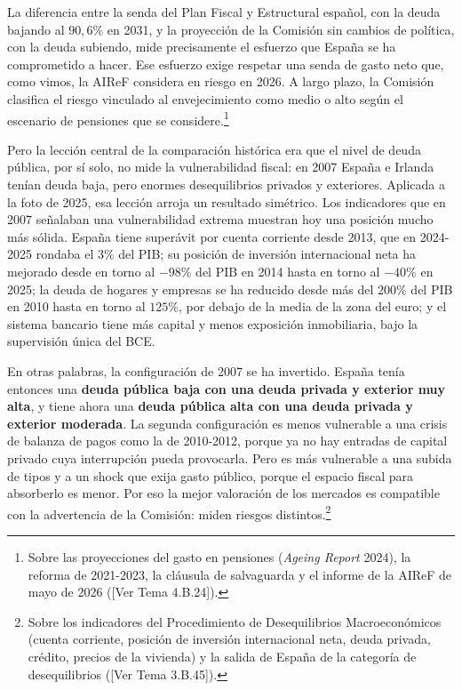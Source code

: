 \documentclass[10pt,a4paper]{article}
\newcommand{\authorfont}[1]{{\fontfamily{EBGaramond-TLF}\selectfont #1}}
\begin{document}
La diferencia entre la senda del Plan Fiscal y Estructural español, con la deuda bajando al $90,6\%$ en 2031, y la proyección de la Comisión sin cambios de política, con la deuda subiendo, mide precisamente el esfuerzo que España se ha comprometido a hacer. Ese esfuerzo exige respetar una senda de gasto neto que, como vimos, la AIReF considera en riesgo en 2026. A largo plazo, la Comisión clasifica el riesgo vinculado al envejecimiento como medio o alto según el escenario de pensiones que se considere.\footnote{Sobre las proyecciones del gasto en pensiones (\textit{Ageing Report} 2024), la reforma de 2021-2023, la cláusula de salvaguarda y el informe de la AIReF de mayo de 2026 ([\authorfont{Ver Tema 4.B.24}]).
}

Pero la lección central de la comparación histórica era que el nivel de deuda pública, por sí solo, no mide la vulnerabilidad fiscal: en 2007 España e Irlanda tenían deuda baja, pero enormes desequilibrios privados y exteriores. Aplicada a la foto de 2025, esa lección arroja un resultado simétrico. Los indicadores que en 2007 señalaban una vulnerabilidad extrema muestran hoy una posición mucho más sólida. España tiene superávit por cuenta corriente desde 2013, que en 2024-2025 rondaba el $3\%$ del PIB; su posición de inversión internacional neta ha mejorado desde en torno al $-98\%$ del PIB en 2014 hasta en torno al $-40\%$ en 2025; la deuda de hogares y empresas se ha reducido desde más del $200\%$ del PIB en 2010 hasta en torno al $125\%$, por debajo de la media de la zona del euro; y el sistema bancario tiene más capital y menos exposición inmobiliaria, bajo la supervisión única del BCE.

En otras palabras, la configuración de 2007 se ha invertido. España tenía entonces una \textbf{deuda pública baja con una deuda privada y exterior muy alta}, y tiene ahora una \textbf{deuda pública alta con una deuda privada y exterior moderada}. La segunda configuración es menos vulnerable a una crisis de balanza de pagos como la de 2010-2012, porque ya no hay entradas de capital privado cuya interrupción pueda provocarla. Pero es más vulnerable a una subida de tipos y a un shock que exija gasto público, porque el espacio fiscal para absorberlo es menor. Por eso la mejor valoración de los mercados es compatible con la advertencia de la Comisión: miden riesgos distintos.\footnote{Sobre los indicadores del Procedimiento de Desequilibrios Macroeconómicos (cuenta corriente, posición de inversión internacional neta, deuda privada, crédito, precios de la vivienda) y la salida de España de la categoría de desequilibrios ([\authorfont{Ver Tema 3.B.45}]).
}
\end{document}
